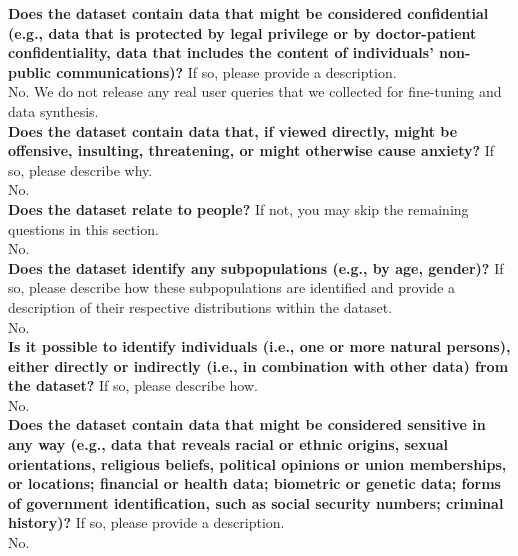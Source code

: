     \textcolor{\sectioncolor}{\textbf{Does the dataset contain data that might be considered confidential (e.g.,
    data that is protected by legal privilege or by doctor-patient
    confidentiality, data that includes the content of individuals’ non-public
    communications)?
    }
    If so, please provide a description.
    } \\
    No. We do not release any real user queries that we collected for fine-tuning and data synthesis. \\
    
    \textcolor{\sectioncolor}{\textbf{Does the dataset contain data that, if viewed directly, might be offensive,
    insulting, threatening, or might otherwise cause anxiety?
    }
    If so, please describe why.
    } \\
    No. \\
    
    \textcolor{\sectioncolor}{\textbf{Does the dataset relate to people?
    }
    If not, you may skip the remaining questions in this section.
    } \\
    No. \\
    
    \textcolor{\sectioncolor}{\textbf{Does the dataset identify any subpopulations (e.g., by age, gender)?
    }
    If so, please describe how these subpopulations are identified and
    provide a description of their respective distributions within the dataset.
    } \\
    No. \\
    
    \textcolor{\sectioncolor}{\textbf{Is it possible to identify individuals (i.e., one or more natural persons),
    either directly or indirectly (i.e., in combination with other data) from
    the dataset?
    }
    If so, please describe how.
    } \\
    No. \\
    
    \textcolor{\sectioncolor}{\textbf{Does the dataset contain data that might be considered sensitive in any way
    (e.g., data that reveals racial or ethnic origins, sexual orientations,
    religious beliefs, political opinions or union memberships, or locations;
    financial or health data; biometric or genetic data; forms of government
    identification, such as social security numbers; criminal history)?
    }
    If so, please provide a description.
    } \\
    No. \\
    
